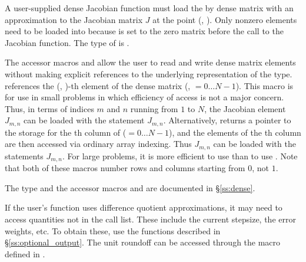 {
  A user-supplied dense Jacobian function must load the  by 
  dense matrix  with an approximation to the Jacobian matrix $J$
  at the point (, ).  Only nonzero elements need to be loaded
  into  because  is set to the zero matrix before the call
  to the Jacobian function. The type of  is . 
  
  The accessor macros  and  allow the user to
  read and write dense matrix elements without making explicit
  references to the underlying representation of the 
  type.  references the (, )-th
  element of the dense matrix  (, $= 0\ldots N-1$). This macro
  is for use in small problems in which efficiency of access is not a major
  concern.  Thus, in terms of indices $m$ and $n$ running from $1$ to
  $N$, the Jacobian element $J_{m,n}$ can be loaded with the statement
   $J_{m,n}$.  Alternatively,
   returns a pointer to the storage for
  the th column of  ($= 0\ldots N-1$), and the 
  elements of the th column
  are then accessed via ordinary array indexing.  Thus $J_{m,n}$ can be 
  loaded with the statements 
   $J_{m,n}$.  For large problems, it is more 
  efficient to use  than to use . 
  Note that both of these macros number rows and columns
  starting from $0$, not $1$.  

  The  type and the accessor macros  and 
   are documented in \S\ref{ss:dense}.

  If the user's  function uses difference quotient approximations,
  it may need to access quantities not in the call list. These include the current
  stepsize, the error weights, etc. To obtain these, use the  functions 
  described in \S\ref{ss:optional_output}. The unit roundoff can be accessed through
  the macro  defined in .
}
